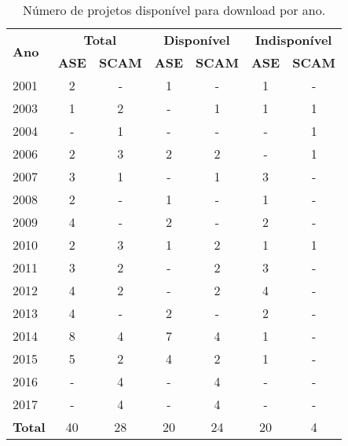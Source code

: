 \begin{table}[h]
\caption{Número de projetos disponível para download por ano.}
\centering
\begin{tabular}{l c c c c c c}
  \hline
\multirow{2}{*}{\textbf{Ano}} & \multicolumn{2}{c}{\textbf{Total}} & \multicolumn{2}{c}{\textbf{Disponível}} & \multicolumn{2}{c}{\textbf{Indisponível}} \\
                              &  \textbf{ASE}   &   \textbf{SCAM}  &    \textbf{ASE}   &   \textbf{SCAM}     &   \textbf{ASE}   &   \textbf{SCAM}        \\
  \hline
  2001 &
    2 &
    - &
    1 &
    - &
    1 &
    - \\
  2003 &
    1 &
    2 &
    - &
    1 &
    1 &
    1 \\
  2004 &
    - &
    1 &
    - &
    - &
    - &
    1 \\
  2006 &
    2 &
    3 &
    2 &
    2 &
    - &
    1 \\
  2007 &
    3 &
    1 &
    - &
    1 &
    3 &
    - \\
  2008 &
    2 &
    - &
    1 &
    - &
    1 &
    - \\
  2009 &
    4 &
    - &
    2 &
    - &
    2 &
    - \\
  2010 &
    2 &
    3 &
    1 &
    2 &
    1 &
    1 \\
  2011 &
    3 &
    2 &
    - &
    2 &
    3 &
    - \\
  2012 &
    4 &
    2 &
    - &
    2 &
    4 &
    - \\
  2013 &
    4 &
    - &
    2 &
    - &
    2 &
    - \\
  2014 &
    8 &
    4 &
    7 &
    4 &
    1 &
    - \\
  2015 &
    5 &
    2 &
    4 &
    2 &
    1 &
    - \\
  2016 &
    - &
    4 &
    - &
    4 &
    - &
    - \\
  2017 &
    - &
    4 &
    - &
    4 &
    - &
    - \\
  \hline
  {\bf Total} &
    40 &
    28 &
    20 &
    24 &
    20 &
    4 \\
  \hline
\end{tabular}
\label{available-table}
\end{table}
